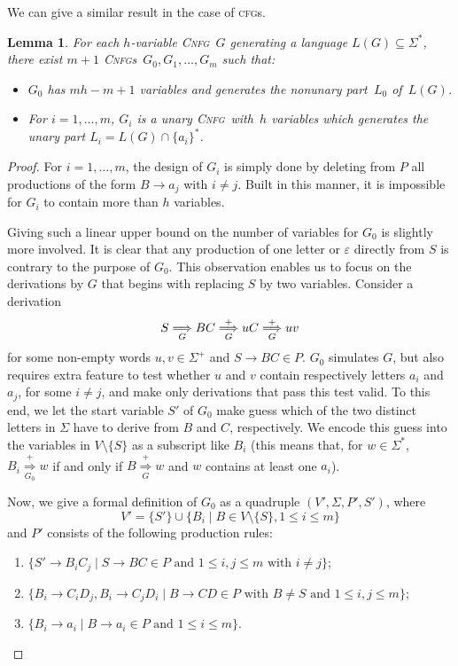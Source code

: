 \documentclass[11pt]{article}
\newcommand*{\cfgs}{\textsc{cfg}s}
\newcommand*{\cnfg}{\textsc{Cnfg}}
\newcommand*{\cnfgs}{\textsc{Cnfg}s}
\newcommand{\derivesForm}[2]{\mathrel{\underset{\scriptstyle #1}{\overset{\scriptstyle #2}{\Longrightarrow}}}}
\newcommand{\DerivesGrammar}[1]{\derivesForm{#1}{+}}
\newcommand{\DERIVESGrammar}[2]{\derivesForm{#1}{#2}}
\newcommand{\derGrammar}[1]{\DERIVESGrammar{#1}{}}
\newcommand{\DerivesG}{\DerivesGrammar{G}}
\newcommand{\derG}{\derGrammar{G}}
\newcommand{\DerivesZ}{\DerivesGrammar{G_0}}
\newtheorem{lemma}[theorem]{Lemma}
\begin{document}
We can give a similar result in the case of \cfgs.

\begin{lemma}\label{lemma:decCFL}
	For each $h$-variable \cnfg~$G$ generating a language $L(G)\subseteq\Sigma^*$,
	there exist $m+1$ \cnfgs\ $G_0,G_1,\ldots,G_m$ such that:
	\begin{itemize}
	\item $G_0$ has $mh{-}m{+}1$ variables and generates the nonunary part~$L_0$ of~$L(G)$.
	\item For $i=1,\ldots,m$, $G_i$ is a unary \cnfg\ with~$h$ variables which
	generates the unary part $L_i=L(G)\cap\{a_i\}^*$.
	\end{itemize}
\end{lemma}
\begin{proof}
For $i=1,\ldots,m$, the design of $G_i$ is simply done by deleting {}from $P$ all productions of the form $B \to a_j$ with $i \neq j$. 
Built in this manner, it is impossible for $G_i$ to contain more than $h$ variables. 

Giving such a linear upper bound on the number of variables for $G_0$ is slightly more involved. 
It is clear that any production of one letter or $\varepsilon$ directly {}from $S$ is contrary to the purpose of $G_0$. 
This observation enables us to focus on the derivations by $G$ that begins with replacing $S$ by two variables. 
Consider a derivation 
\[
S \derG BC \DerivesG u C \DerivesG uv
\] 
for some non-empty words  $u, v \in \Sigma^+$ and $S \to BC \in P$. 
$G_0$ simulates $G$, but also requires extra feature to test whether $u$ and $v$ contain respectively letters $a_i$ and $a_j$,
for some $i \neq j$, and make only derivations that pass this test valid.  
To this end, we let the start variable $S'$ of $G_0$ make guess which of the two distinct letters in 
$\Sigma$ have to derive {}from $B$ and $C$, respectively. 
We encode this guess into the variables in $V \setminus \{S\}$ as a subscript like $B_i$ (this means that, 
for $w \in \Sigma^*$, $B_i \DerivesZ w$ if and only if $B \DerivesG w$ and $w$ contains at least one $a_i$).

Now, we give a formal definition of $G_0$ as a quadruple $(V', \Sigma, P', S')$, where 
\[V' = \{S'\} \cup \{B_i \mid B \in V \setminus \{S\}, 1 \le i \le m\}\] 
and $P'$ consists of the following production rules: 
\begin{enumerate}
\item	$\{S' \to B_i C_j \mid \mbox{$S \to BC \in P$ and $1 \le i, j \le m$ with $i \neq j$}\}$; 
\item	$\{B_i \to C_i D_j, B_i \to C_j D_i \mid \mbox{$B \to CD \in\!P$ with $B \neq S$ and $1\!\le\!i, j\!\le\!m$}\}$; 
\item	$\{B_i \to a_i \mid \mbox{$B \to a_i \in P$ and $1 \le i \le m$}\}$. 
\end{enumerate}


\end{proof}
\end{document}
